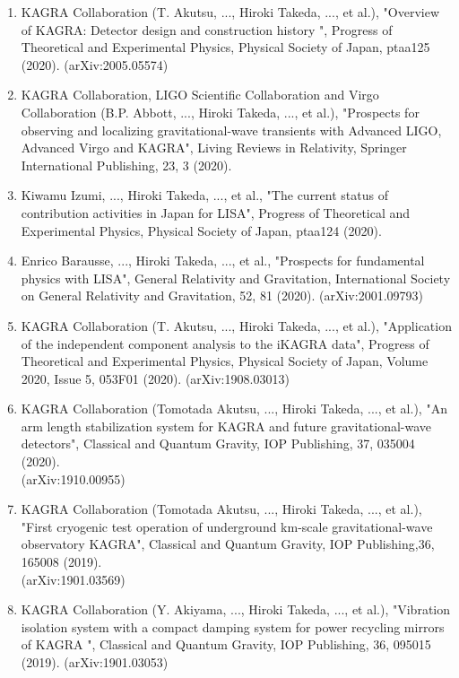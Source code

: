 \documentclass[12pt,a4paper]{article}
\begin{document}
\begin{enumerate}
\item KAGRA Collaboration (T. Akutsu, ..., Hiroki Takeda, ..., et al.), "Overview of KAGRA: Detector design and construction history ", Progress of Theoretical and Experimental Physics, Physical Society of Japan, ptaa125 (2020). (arXiv:2005.05574)

\item KAGRA Collaboration, LIGO Scientific Collaboration and Virgo Collaboration (B.P. Abbott, ..., Hiroki Takeda, ..., et al.), "Prospects for observing and localizing gravitational-wave transients with Advanced LIGO, Advanced Virgo and KAGRA", Living Reviews in Relativity, Springer International Publishing, 23, 3 (2020).

\item Kiwamu Izumi, ..., Hiroki Takeda, ..., et al., "The current status of contribution activities in Japan for LISA", Progress of Theoretical and Experimental Physics, Physical Society of Japan, ptaa124 (2020).

\item Enrico Barausse, ..., Hiroki Takeda, ..., et al., "Prospects for fundamental physics with LISA", General Relativity and Gravitation, International Society on General Relativity and Gravitation, 52, 81 (2020). (arXiv:2001.09793)

\item KAGRA Collaboration (T. Akutsu, ..., Hiroki Takeda, ..., et al.), "Application of the independent component analysis to the iKAGRA data", Progress of Theoretical and Experimental Physics, Physical Society of Japan, Volume 2020, Issue 5, 053F01 (2020). (arXiv:1908.03013)

\item KAGRA Collaboration (Tomotada Akutsu, ..., Hiroki Takeda, ..., et al.), "An arm length stabilization system for KAGRA and future gravitational-wave detectors", Classical and Quantum Gravity, IOP Publishing, 37, 035004 (2020).\\ (arXiv:1910.00955)

\item KAGRA Collaboration (Tomotada Akutsu, ..., Hiroki Takeda, ..., et al.), "First cryogenic test operation of underground km-scale gravitational-wave observatory KAGRA", Classical and Quantum Gravity, IOP Publishing,36, 165008 (2019).\\ (arXiv:1901.03569)

\item KAGRA Collaboration (Y. Akiyama, ..., Hiroki Takeda, ..., et al.), "Vibration isolation system with a compact damping system for power recycling mirrors of KAGRA ", Classical and Quantum Gravity, IOP Publishing, 36, 095015 (2019). (arXiv:1901.03053)


\end{enumerate}
\end{document}

